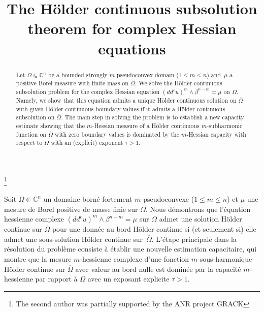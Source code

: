 \documentclass[JEP,XML,SOM,Unicode]{cedram}
\theoremstyle{definition}
\begin{document}
\frontmatter
\title[The Hölder continuous subsolution theorem]{The Hölder continuous subsolution theorem for complex Hessian equations }

\author[\initial{A.} \lastname{Benali}]{ }
\address{University of Gabès, Faculty of Sciences of Gabès, LR17ES11, Mathematics and Applications\\
6072 Gabès, Tunisia}

\author[\initial{A.} \lastname{Zeriahi}]{ }
\address{Institut de Mathématiques de Toulouse, Université de Toulouse, CNRS, UPS\\
118 route de Narbonne, 31062 Toulouse cedex 09, France}

\thanks{The second author was partially supported by the ANR project GRACK}



\begin{abstract}
Let $\Omega \Subset \mathbb{C}^n$ be a bounded strongly $m$-pseudoconvex domain ($1\leq m\leq n$) and~$\mu$ a positive Borel measure with finite mass on $\Omega$. We solve the Hölder continuous subsolution problem for the complex Hessian equation $(dd^c u)^m \wedge \beta^{n - m} = \mu$ on $\Omega$. Namely, we show that this equation admits a unique Hölder continuous solution on $\overline{\Omega}$ with given Hölder continuous boundary values if it admits a Hölder continuous subsolution on $\overline{\Omega}$. The main step in solving the problem is to establish a new capacity estimate showing that the $m$-Hessian measure of a Hölder continuous $m$-subharmonic function on $\overline{\Omega}$ with zero boundary values is dominated by the $m$-Hessian capacity with respect to $\Omega$ with an (explicit) exponent $\tau > 1$.
\end{abstract}


\begin{altabstract}
Soit $\Omega \Subset \mathbb{C}^n$ un domaine borné fortement $m$-pseudoconvexe ($1\leq m\leq n$) et $\mu$ une mesure de Borel positive de masse finie sur $\Omega$. Nous démontrons que l'équation hessienne complexe $(dd^c u)^m \wedge \beta^{n - m} = \mu$ sur $\Omega$ admet une solution Hölder continue sur $\overline{\Omega}$ pour une donnée au bord Hölder continue si (et seulement si) elle admet une sous-solution Hölder continue sur~$\overline{\Omega}$. L'étape principale dans la résolution du problème consiste à établir une nouvelle estimation capacitaire, qui montre que la mesure $m$-hessienne complexe d'une fonction $m$-sous-harmonique Hölder continue sur $\overline{\Omega}$ avec valeur au bord nulle est dominée par la capacité $m$-hessienne par rapport à $\Omega$ avec un exposant explicite $\tau >1$.
\end{altabstract}
\end{document}
